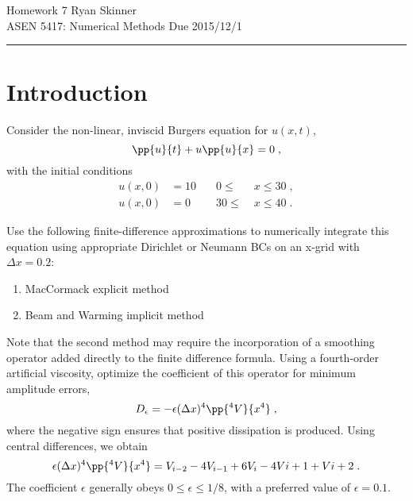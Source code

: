 \documentclass[11pt]{article}
\begin{document}
\pagestyle{fancyplain}
\lhead{}
\chead{}
\rhead{}
\cfoot{\hrule \thepage}

\noindent
{\Large Homework 7}
\hfill
{\large Ryan Skinner}
\\[0.5ex]
{\large ASEN 5417: Numerical Methods}
\hfill
{\large Due 2015/12/1}\\
\hrule
\vspace{6pt}

\section{Introduction} %

Consider the non-linear, inviscid Burgers equation for $u(x,t)$,
\begin{equation}
\pp{u}{t} + u \pp{u}{x} = 0
\;,
\end{equation}
with the initial conditions
\begin{equation}
\begin{aligned}
u(x,0) &= 10 &\quad 0  \le\; &x \le 30 \;, \\
u(x,0) &= 0  &\quad 30 \le\; &x \le 40 \;.
\end{aligned}
\end{equation}

Use the following finite-difference approximations to numerically integrate this equation using appropriate Dirichlet or Neumann BCs on an x-grid with $\Delta x = 0.2$:
\begin{enumerate}
\item MacCormack explicit method
\item Beam and Warming implicit method
\end{enumerate}

Note that the second method  may require the incorporation of a smoothing operator added directly to the finite difference formula. Using a fourth-order artificial viscosity, optimize the coefficient of this operator for minimum amplitude errors,
\begin{equation}
D_\epsilon = - \epsilon(\Delta x)^4 \pp{^4 V}{x^4}
\;,
\end{equation}
where the negative sign ensures that positive dissipation is produced. Using central differences, we obtain
\begin{equation}
\epsilon(\Delta x)^4 \pp{^4 V}{x^4} = V_{i-2} -4V_{i-1} +6V_i -4V{i+1} +V{i+2}
\;.
\end{equation}
The coefficient $\epsilon$ generally obeys $0 \le \epsilon \le 1/8$, with a preferred value of $\epsilon = 0.1$.
\end{document}
